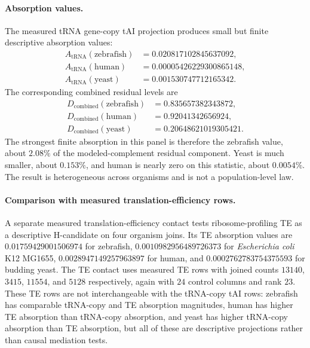 \paragraph{Absorption values.}
The measured tRNA gene-copy tAI projection produces small but finite descriptive absorption values:
$$
\begin{aligned}
A_{\mathrm{tRNA}}(\mathrm{zebrafish})&=0.020817102845637092,\\
A_{\mathrm{tRNA}}(\mathrm{human})&=0.00005426229300865148,\\
A_{\mathrm{tRNA}}(\mathrm{yeast})&=0.001530747712165342.
\end{aligned}
$$
The corresponding combined residual levels are
$$
\begin{aligned}
D_{\mathrm{combined}}(\mathrm{zebrafish})&=0.835657382343872,\\
D_{\mathrm{combined}}(\mathrm{human})&=0.92041342656924,\\
D_{\mathrm{combined}}(\mathrm{yeast})&=0.20648621019305421.
\end{aligned}
$$
The strongest finite absorption in this panel is therefore the zebrafish value, about $2.08\%$ of the modeled-complement residual component.  Yeast is much smaller, about $0.153\%$, and human is nearly zero on this statistic, about $0.0054\%$.  The result is heterogeneous across organisms and is not a population-level law.

\paragraph{Comparison with measured translation-efficiency rows.}
A separate measured translation-efficiency contact tests ribosome-profiling TE as a descriptive H-candidate on four organism joins.  Its TE absorption values are $0.01759429001506974$ for zebrafish, $0.0010982956489726373$ for \emph{Escherichia coli} K12 MG1655, $0.0028947149257963897$ for human, and $0.0002762783754375593$ for budding yeast.  The TE contact uses measured TE rows with joined counts $13140$, $3415$, $11554$, and $5128$ respectively, again with $24$ control columns and rank $23$.  These TE rows are not interchangeable with the tRNA-copy tAI rows: zebrafish has comparable tRNA-copy and TE absorption magnitudes, human has higher TE absorption than tRNA-copy absorption, and yeast has higher tRNA-copy absorption than TE absorption, but all of these are descriptive projections rather than causal mediation tests.

